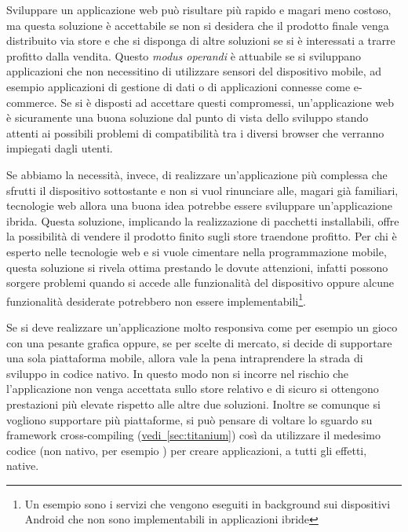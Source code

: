         Sviluppare un applicazione web può risultare più rapido e magari meno
        costoso, ma questa soluzione è accettabile se non si desidera che il
        prodotto finale venga distribuito via \mbox{store} e che si disponga di
        altre soluzioni se si è interessati a trarre profitto dalla vendita.
        Questo \textit{modus operandi} è attuabile se si sviluppano applicazioni
        che non necessitino di utilizzare sensori del dispositivo mobile, ad
        esempio applicazioni di gestione di dati o di applicazioni connesse
        come e-com\-merce. Se si è disposti ad accettare questi compromessi,
        un'applicazione web è sicuramente una buona soluzione dal punto di vista
        dello sviluppo \crossplat{} stando attenti ai possibili problemi di
        compatibilità tra i diversi \mbox{browser} che verranno impiegati dagli utenti.

        Se abbiamo la necessità, invece, di realizzare un'applicazione più
        complessa che sfrutti il dispositivo sottostante e non si vuol
        rinunciare alle, magari già familiari, tecnologie web allora una buona
        idea potrebbe essere sviluppare un'applicazione ibrida. Questa
        soluzione, implicando la realizzazione di pacchetti installabili, offre
        la possibilità di vendere il prodotto finito sugli \mbox{store} traendone
        profitto. Per chi è esperto nelle tecnologie web e si vuole cimentare
        nella programmazione mobile, questa soluzione si rivela ottima prestando
        le dovute attenzioni, infatti possono sorgere problemi quando si accede
        alle funzionalità del dispositivo oppure alcune funzionalità desiderate
        potrebbero non essere implementabili\footnote{Un esempio sono i servizi
        che vengono eseguiti in back\-ground sui dispositivi Android che non sono
        implementabili in applicazioni ibride}.

        Se si deve realizzare un'applicazione molto responsiva come per esempio
        un gioco con una pesante grafica oppure, se per scelte di mercato, si
        decide di supportare una sola piattaforma mobile, allora vale la pena
        intraprendere la strada di sviluppo in codice nativo. In questo modo non
        si incorre nel rischio che l'applicazione non venga accettata sullo
        \mbox{store} relativo e di sicuro si ottengono prestazioni più elevate rispetto
        alle altre due soluzioni. Inoltre se comunque si vogliono supportare più
        piattaforme, si può pensare di voltare lo sguardo su frame\-work
        cross-com\-pil\-ing (\hyperref[sec:titanium]{vedi~\ref{sec:titanium}}) così
        da utilizzare il medesimo codice (non nativo, per esempio \js{})
        per creare applicazioni, a tutti gli effetti, native.

